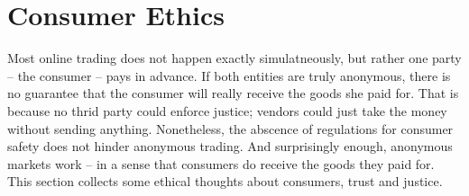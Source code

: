 \section{Consumer Ethics}

Most online trading does not happen exactly simulatneously, but rather one party -- the consumer -- pays in advance. If both entities are truly anonymous, there is no guarantee that the consumer will really receive the goods she paid for. That is because no thrid party could enforce justice; vendors could just take the money without sending anything. Nonetheless, the abscence of regulations for consumer safety does not hinder anonymous trading. And surprisingly enough, anonymous markets work -- in a sense that consumers do receive the goods they paid for\cite{silkroad2013}. This section collects some ethical thoughts about consumers, trust and justice. 



% 
% 
% 
% 
% 

